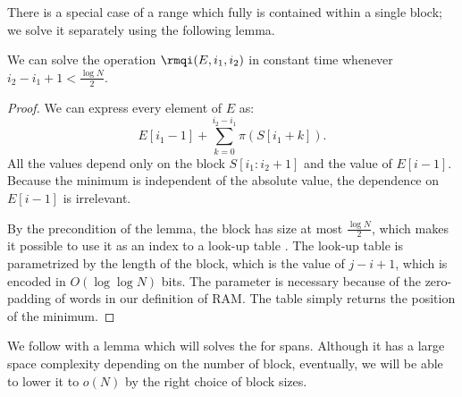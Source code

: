 There is a special case of a range which fully is contained within a single block; we solve it separately using the following lemma.
\begin{lemma}\label{lemma:rmq1}
	We can solve the operation $\rmqi(E, i_1, i_2)$ in constant time whenever $i_2 - i_1 + 1 < \frac{\log N}{2}$.
\end{lemma}
\begin{proof}
	We can express every element of $E$ as:
	$$ E[i_1 - 1] + \sum_{k = 0}^{i_2 - i_1} \pi(S[i_1 + k]). $$
	All the values depend only on the block $S[i_1 : i_2 + 1]$ and the value of $E[i - 1]$.
	Because the minimum is independent of the absolute value, the dependence on $E[i - 1]$ is irrelevant.
	
	By the precondition of the lemma, the block has size at most $\frac{\log N}{2}$, which makes it possible to use it as an index to a look-up table \rmqi.
	The look-up table is parametrized by the length of the block, which is the value of $j - i + 1$, which is encoded in $O(\log \log N)$ bits.
	The parameter is necessary because of the zero-padding of words in our definition of RAM.
	The table simply returns the position of the minimum.
\end{proof}

\bigbreak

We follow with a lemma which will solves the \rmqi{} for spans.
Although it has a large space complexity depending on the number of block, eventually, we will be able to lower it to $o(N)$ by the right choice of block sizes.

